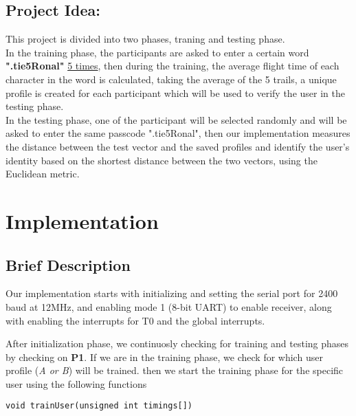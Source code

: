 \documentclass[runningheads]{llncs}
\begin{document}
\subsection{Project Idea:} 
This project is divided into two phases, traning and testing phase. \\

In the training phase, the participants are asked to enter a certain word \textbf{".tie5Ronal"} \underline{5 times}, then during the training, the average flight time of each character in the word is calculated, taking the average of the 5 trails, a unique profile is created for each participant which will be used to verify the user in the testing phase. \\

In the testing phase, one of the participant will be selected randomly and will be asked to enter the same passcode ".tie5Ronal", then our implementation measures the distance between the test vector and the saved profiles and identify the user's identity based on the shortest distance between the two vectors, using the Euclidean metric. \newline \newline \newline

%
%
%

\section{Implementation}

\subsection{Brief Description}
Our implementation starts with initializing and setting the serial port for 2400 baud at 12MHz, and enabling mode 1 (8-bit UART) to enable receiver, along with enabling the interrupts for T0 and the global interrupts. \newline \newline 

After initialization phase, we continuosly checking for training and testing phases by checking on \textbf{P1}. If we are in the training phase, we check for which user profile (\textit{A or B}) will be trained. then we start the training phase for the specific user using the following functions 

\begin{lstlisting}[style=CStyle]
void trainUser(unsigned int timings[])
\end{lstlisting}
\end{document}
